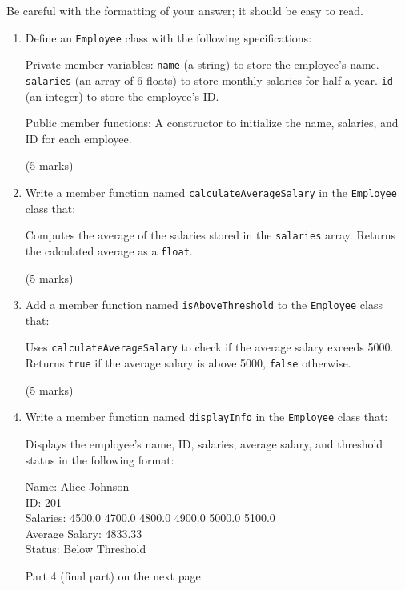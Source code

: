 \documentclass[a4paper,12pt]{article}
\begin{document}
Be careful with the formatting of your answer; it should be easy to read.

\begin{enumerate}
    \item Define an \verb|Employee| class with the following specifications:

    Private member variables:
        \verb|name| (a string) to store the employee's name.
        \verb|salaries| (an array of 6 floats) to store monthly salaries for half a year.
        \verb|id| (an integer) to store the employee's ID.

    Public member functions:
        A constructor to initialize the name, salaries, and ID for each employee.

    (5 marks)

    \item Write a member function named \verb|calculateAverageSalary| in the \verb|Employee| class that:

    Computes the average of the salaries stored in the \verb|salaries| array.
    Returns the calculated average as a \verb|float|.

    (5 marks)

    \item Add a member function named \verb|isAboveThreshold| to the \verb|Employee| class that:

    Uses \verb|calculateAverageSalary| to check if the average salary exceeds 5000.
    Returns \verb|true| if the average salary is above 5000, \verb|false| otherwise.

    (5 marks)

    \item Write a member function named \verb|displayInfo| in the \verb|Employee| class that:

    Displays the employee's name, ID, salaries, average salary, and threshold status in the following format:

    Name: Alice Johnson\\
    ID: 201\\
    Salaries: 4500.0 4700.0 4800.0 4900.0 5000.0 5100.0\\
    Average Salary: 4833.33\\
    Status: Below Threshold\\

    \begin{center}
        Part 4 (final part) on the next page
    \end{center}


\end{enumerate}
\end{document}
